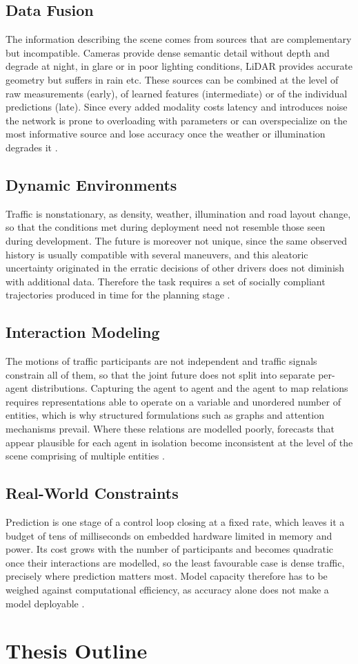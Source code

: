 \subsection{Data Fusion}
The information describing the scene comes from sources that are complementary but incompatible. Cameras
provide dense semantic detail without depth and degrade at night, in glare or in poor lighting
conditions, LiDAR provides accurate geometry but suffers in rain etc.
These sources can be combined at the level of raw measurements (early), of learned features (intermediate) or of the individual predictions (late).
Since every added modality costs latency and introduces noise the network is prone to overloading with parameters or can overspecialize 
on the most informative source and lose accuracy once the weather or illumination degrades it \cite{madjid2025survey}.

\subsection{Dynamic Environments}
Traffic is nonstationary, as density, weather, illumination and road layout change, so that the conditions
met during deployment need not resemble those seen during development. The future is moreover not unique,
since the same observed history is usually compatible with several maneuvers, and this aleatoric uncertainty
originated in the erratic decisions of other drivers does not diminish with additional
data. Therefore the task requires a set of socially compliant
trajectories produced in time for the planning stage \cite{madjid2025survey}.

\subsection{Interaction Modeling}
The motions of traffic participants are not independent and traffic signals constrain all of them, so that the joint
future does not split into separate per-agent distributions. Capturing the agent to agent and the agent
to map relations requires representations able to operate on a variable and unordered number of entities,
which is why structured formulations such as graphs and attention mechanisms prevail. Where these relations
are modelled poorly, forecasts that appear plausible for each agent in isolation become inconsistent at the
level of the scene comprising of multiple entities \cite{huang2022survey}.

\subsection{Real-World Constraints}
Prediction is one stage of a control loop closing at a fixed rate, which leaves it a budget of tens of
milliseconds on embedded hardware limited in memory and power. Its cost grows with the number of
participants and becomes quadratic once their interactions are modelled, so the least favourable case is
dense traffic, precisely where prediction matters most. Model capacity therefore has to be weighed against
computational efficiency, as accuracy alone does not make a model deployable
\cite{Wayformer2022,huang2022survey}.


\section{Thesis Outline}



